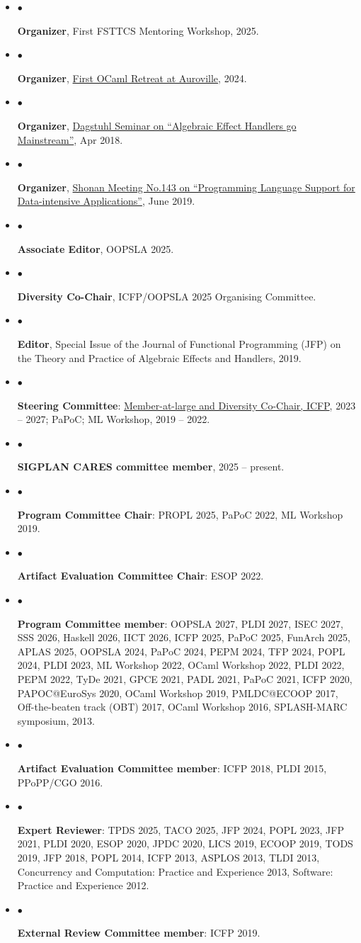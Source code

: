 \documentclass[10pt]{article}
\newcommand{\lbar}[1]{{\color{#1}\ding{118}}\hspace*{2pt}}
\newcommand{\service}[1]{\item $\bullet$ \hspace{1ex}\parbox{7.2in}{#1}}
\newenvironment{itemregion}[1]{
  \Needspace{5\baselineskip}
  \vspace*{0.5ex}
  {\scalebox{1.4}{\textbf{#1}}}
  \begin{itemize}\itemsep1pt}
  {\end{itemize}\vspace{0.8ex}}
\begin{document}
\begin{itemregion} {\lbar{blue}Academic Service}
	\service{\textbf{Organizer}, First FSTTCS Mentoring Workshop, 2025.}
	\service{\textbf{Organizer}, \href{https://ocamlretreat.org/}{First OCaml Retreat at Auroville}, 2024.}
	\service{\textbf{Organizer}, \href{http://www.dagstuhl.de/en/program/calendar/semhp/?semnr=18172}{Dagstuhl Seminar on ``Algebraic Effect Handlers go Mainstream''}, Apr 2018.}
	\service{\textbf{Organizer}, \href{https://shonan.nii.ac.jp/seminars/143/}{Shonan Meeting No.143 on ``Programming Language Support for Data-intensive Applications''}, June 2019.}
  \service{\textbf{Associate Editor}, OOPSLA 2025.}
  \service{\textbf{Diversity Co-Chair}, ICFP/OOPSLA 2025 Organising Committee.}
	\service{\textbf{Editor}, Special Issue of the Journal of Functional Programming (JFP) on the Theory and Practice of Algebraic Effects and Handlers, 2019.}
  \service{\textbf{Steering Committee}: \href{https://www.icfpconference.org/structure.html}{Member-at-large and Diversity Co-Chair, ICFP}, 2023 -- 2027; PaPoC; ML Workshop, 2019 -- 2022.}
  \service{\textbf{SIGPLAN CARES committee member}, 2025 -- present.}
	\service{\textbf{Program Committee Chair}: PROPL 2025, PaPoC 2022, ML Workshop 2019.}
	\service{\textbf{Artifact Evaluation Committee Chair}: ESOP 2022.}
  \service{\textbf{Program Committee member}: OOPSLA 2027, PLDI 2027, ISEC 2027, SSS 2026, Haskell 2026, IICT 2026, ICFP 2025, PaPoC 2025, FunArch
  2025, APLAS 2025, OOPSLA 2024, PaPoC 2024, PEPM 2024, TFP 2024, POPL 2024,
  PLDI 2023, ML Workshop 2022, OCaml Workshop 2022, PLDI 2022, PEPM 2022, TyDe
  2021, GPCE 2021, PADL 2021, PaPoC 2021, ICFP 2020, PAPOC@EuroSys 2020, OCaml
  Workshop 2019, PMLDC@ECOOP 2017, Off-the-beaten track (OBT) 2017, OCaml
  Workshop 2016, SPLASH-MARC symposium, 2013.}
	\service{\textbf{Artifact Evaluation Committee member}: ICFP 2018, PLDI 2015, PPoPP/CGO 2016.} \vspace{0.5ex}
  \service{\textbf{Expert Reviewer}: TPDS 2025, TACO 2025, JFP 2024, POPL 2023,
  JFP 2021, PLDI 2020, ESOP 2020, JPDC 2020, LICS 2019, ECOOP 2019, TODS 2019,
  JFP 2018, POPL 2014, ICFP 2013, ASPLOS 2013, TLDI 2013, Concurrency and
  Computation: Practice and Experience 2013, Software: Practice and Experience
  2012.}
	\service{\textbf{External Review Committee member}: ICFP 2019.}
\end{itemregion}
\end{document}
